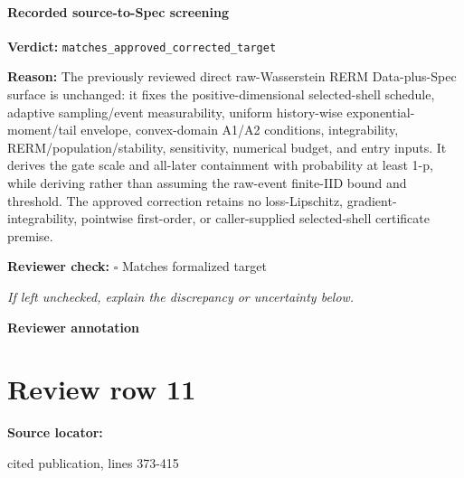 \documentclass[10pt]{article}
\newcommand{\reviewerbox}{%
  \par\noindent\fbox{\parbox{0.96\linewidth}{\rule{0pt}{0.38in}}}\par
}
\newcommand{\reviewmatch}[1]{%
  \par\noindent\textbf{Reviewer check:} $\square$\; #1\par
  \noindent\emph{If left unchecked, explain the discrepancy or uncertainty below.}\par
}
\begin{document}
\paragraph{Recorded source-to-Spec screening}
\textbf{Verdict:} \texttt{matches\_approved\_corrected\_target}
\\
{\raggedright
\textbf{Reason:} The previously reviewed direct raw-\allowbreak{}Wasserstein RERM Data-\allowbreak{}plus-\allowbreak{}Spec surface is unchanged:\allowbreak{} it fixes the positive-\allowbreak{}dimensional selected-\allowbreak{}shell schedule, adaptive sampling/\allowbreak{}event measurability, uniform history-\allowbreak{}wise exponential-\allowbreak{}moment/\allowbreak{}tail envelope, convex-\allowbreak{}domain A1/\allowbreak{}A2 conditions, integrability, RERM/\allowbreak{}population/\allowbreak{}stability, sensitivity, numerical budget, and entry inputs.\allowbreak{} It derives the gate scale and all-\allowbreak{}later containment with probability at least 1-\allowbreak{}p, while deriving rather than assuming the raw-\allowbreak{}event finite-\allowbreak{}IID bound and threshold.\allowbreak{} The approved correction retains no loss-\allowbreak{}Lipschitz, gradient-\allowbreak{}integrability, pointwise first-\allowbreak{}order, or caller-\allowbreak{}supplied selected-\allowbreak{}shell certificate premise.\allowbreak{}
\par}
\reviewmatch{Matches formalized target}
\noindent\textbf{Reviewer annotation}\par
\reviewerbox
\clearpage
\hypertarget{source-claim-2e42d97b744932d5}{}
\section*{Review row 11}
\textbf{Source locator:} {\footnotesize\raggedright cited publication, lines 373-\allowbreak{}415\par}
\end{document}
